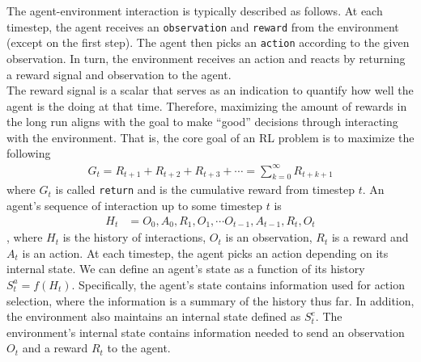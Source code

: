 \documentclass[12pt]{report}
\begin{document}

The agent-environment interaction is typically described as follows. At each timestep, the agent receives an \texttt{observation} and \texttt{reward} from the environment (except on the first step). The agent then picks an \texttt{action} according to the given observation. In turn, the environment receives an action and reacts by returning a reward signal and observation to the agent.\\

The reward signal is a scalar that serves as an indication to quantify how well the agent is the doing at that time. Therefore, maximizing the amount of rewards in the long run aligns with the goal to make ``good'' decisions through interacting with the environment. That is, the core goal of an RL problem is to maximize the following
\begin{align}
    G_t = R_{t+1} + R_{t+2} + R_{t+3} + \cdots = \sum_{k=0}^\infty R_{t+k+1} \label{eq:gamma1-return}
\end{align}
where $G_t$ is called \texttt{return} and is the cumulative reward from timestep $t$. An agent's sequence of interaction up to some timestep $t$ is
\begin{align}
    H_t &= O_0, A_0, R_1, O_1, \cdots O_{t-1}, A_{t-1}, R_t, O_t\nonumber
\end{align}
, where $H_t$ is the history of interactions, $O_t$ is an observation, $R_t$ is a reward and $A_t$ is an action. At each timestep, the agent picks an action depending on its internal state. We can define an agent's state as a function of its history $S_t^a = f(H_t)$. Specifically, the agent's state contains information used for action selection, where the information is a summary of the history thus far. In addition, the environment also maintains an internal state defined as $S_t^e$. The environment's internal state contains information needed to send an observation $O_t$ and a reward $R_t$ to the agent.\\
\end{document}

